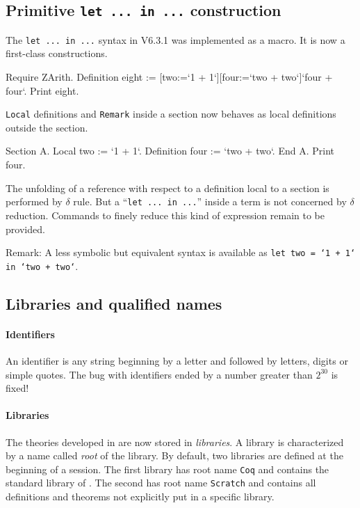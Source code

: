 \documentclass[11pt]{article}
\begin{document}
\subsection{Primitive {\tt let ... in ...} construction}
\label{Letin}
The {\tt let ... in ...} syntax in V6.3.1 was implemented as a
macro. It is now a first-class constructions.

\begin{coq_example}
Require ZArith.
Definition eight := [two:=`1 + 1`][four:=`two + two`]`four + four`. 
Print eight.
\end{coq_example}

{\tt Local} definitions and {\tt Remark} inside a section now behaves
as local definitions outside the section.

\begin{coq_example}
Section A.
Local two := `1 + 1`.
Definition four := `two + two`.
End A.
Print four.
\end{coq_example}

The unfolding of a reference with respect to a definition local to a section
is performed by $\delta$ rule. But a ``{\tt let ... in ...}'' inside a term
is not concerned by $\delta$ reduction. Commands to finely reduce this
kind of expression remain to be provided.
\medskip

Remark: A less symbolic but equivalent syntax is available as {\tt let
two = `1 + 1` in `two + two`}.

\subsection{Libraries and qualified names}
\label{Names}

\paragraph{Identifiers} An identifier is any string beginning by a
letter and followed by letters, digits or simple quotes. The bug
with identifiers ended by a number greater than $2^{30}$ is fixed!

\paragraph{Libraries}

The theories developed in {\Coq} are now stored in {\it libraries}.  A
library is characterized by a name called {\it root} of the
library. By default, two libraries are defined at the beginning of a
{\Coq} session. The first library has root name {\tt Coq} and contains the
standard library of \Coq. The second has root name {\tt Scratch} and
contains all definitions and theorems not explicitly put in a specific
library. 
\end{document}

